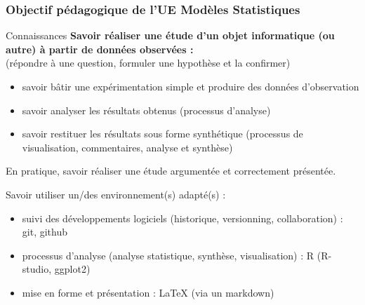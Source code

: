 \documentclass[xcolor=x11names,compress,8pt]{beamer}
\renewcommand{\(}{\begin{columns}}
\renewcommand{\)}{\end{columns}}
\newcommand{\<}[1]{\begin{column}{#1}}
\renewcommand{\>}{\end{column}}
\begin{document}
\begin{frame}
\frametitle{Objectif pédagogique de l'UE Modèles Statistiques}
\begin{alertblock}{Connaissances}
\textbf{Savoir réaliser une étude d'un objet informatique (ou autre) à partir de données observées :}\\
(répondre à une question, formuler une hypothèse et la confirmer)
\begin{itemize}
\item savoir bâtir une expérimentation simple et produire des données
  d'observation
\item savoir analyser les résultats obtenus (processus d'analyse)
\item savoir restituer les résultats sous forme synthétique (processus de
  visualisation, commentaires, analyse et synthèse)
\end{itemize}
En pratique, savoir réaliser une étude argumentée et correctement
présentée.
\end{alertblock}

\begin{alertblock}{Savoir utiliser un/des environnement(s) adapté(s) :}
\begin{itemize}
\item suivi des développements logiciels (historique, versionning, collaboration) : git, github
\item processus d'analyse (analyse statistique, synthèse, visualisation) : R (R-studio, ggplot2)
\item mise en forme et présentation : LaTeX (via un markdown)
\end{itemize}
\end{alertblock}
\end{frame}
\end{document}
